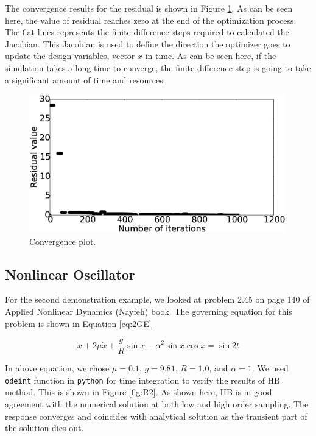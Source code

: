 \documentclass[12pt, a4paper]{extarticle}
\begin{document}
The convergence results for the residual is shown in Figure \ref{fig:R1_convergence}. As can be seen here, the value of residual reaches zero at the end of the optimization process. The flat lines represents the finite difference steps required to calculated the Jacobian. This Jacobian is used to define the direction the optimizer goes to update the design variables, vector $x$ in time. As can be seen here, if the simulation takes a long time to converge, the finite difference step is going to take a significant amount of time and resources.

\begin{figure}[h]
	\centering
	\includegraphics[height=6.00cm]{figure/convergence_study_31.eps}
	\caption{Convergence plot.}
	\label{fig:R1_convergence}
\end{figure}

\subsection{Nonlinear Oscillator}
For the second demonstration example, we looked at problem 2.45 on page 140 of Applied Nonlinear Dynamics (Nayfeh) book. The governing equation for this problem is shown in Equation \eqref{eq:2GE}

\begin{equation}\label{eq:2GE}
	\ddot{x} + 2 \mu \dot{x} + \frac{g}{R} \sin x - \alpha^2 \sin x \cos x = \sin 2t
\end{equation}

In above equation, we chose $\mu = 0.1$, $g = 9.81$, $R = 1.0$, and $\alpha = 1$. We used \texttt{odeint} function in \texttt{python} for time integration to verify the results of HB method. This is shown in Figure \ref{fig:R2}. As shown here, HB is in good agreement with the numerical solution at both low and high order sampling. The response converges and coincides with analytical solution as the transient part of the solution dies out.
\end{document}
